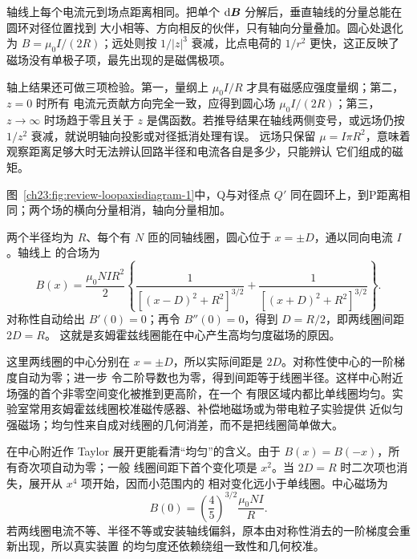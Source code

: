 {轴线上每个电流元到场点距离相同。把单个 $\mathop{}\!\mathrm d\bm{B}$ 分解后，垂直轴线的分量总能在圆环对径位置找到
大小相等、方向相反的伙伴，只有轴向分量叠加。圆心处退化为 $B=\mu_0I/(2R)$；远处则按 $1/|z|^3$
衰减，比点电荷的 $1/r^2$ 更快，这正反映了磁场没有单极子项，最先出现的是磁偶极项。

轴上结果还可做三项检验。第一，量纲上 $\mu_0I/R$ 才具有磁感应强度量纲；第二，$z=0$ 时所有
电流元贡献方向完全一致，应得到圆心场 $\mu_0I/(2R)$；第三，$z\to\infty$ 时场趋于零且关于 $z$
是偶函数。若推导结果在轴线两侧变号，或远场仍按 $1/z^2$ 衰减，就说明轴向投影或对径抵消处理有误。
远场只保留 $\mu=I\pi R^2$，意味着观察距离足够大时无法辨认回路半径和电流各自是多少，只能辨认
它们组成的磁矩。

图~\ref{ch23:fig:review-loopaxisdiagram-1}中，Q与对径点 $Q\prime$ 同在圆环上，到P距离相同；两个场的横向分量相消，轴向分量相加。
\par\noindent\begin{minipage}{\linewidth}
\loopAxisDiagram
{}
\end{minipage}\par\medskip

两个半径均为 $R$、每个有 $N$ 匝的同轴线圈，圆心位于 $x=\pm D$，通以同向电流 $I$。轴线上
的合场为
\begin{equation}
  B(x)=\frac{\mu_0NIR^2}{2}
  \left\{
  \frac{1}{[(x-D)^2+R^2]^{3/2}}
  +\frac{1}{[(x+D)^2+R^2]^{3/2}}
  \right\}.
\end{equation}
对称性自动给出 $B'(0)=0$；再令 $B''(0)=0$，得到 $D=R/2$，即两线圈间距 $2D=R$。
这就是亥姆霍兹线圈能在中心产生高均匀度磁场的原因。

这里两线圈的中心分别在 $x=\pm D$，所以实际间距是 $2D$。对称性使中心的一阶梯度自动为零；进一步
令二阶导数也为零，得到间距等于线圈半径。这样中心附近场强的首个非零空间变化被推到更高阶，在一个
有限区域内都比单线圈均匀。实验室常用亥姆霍兹线圈校准磁传感器、补偿地磁场或为带电粒子实验提供
近似匀强磁场；均匀性来自成对线圈的几何消差，而不是把线圈简单做大。

在中心附近作 Taylor 展开更能看清“均匀”的含义。由于 $B(x)=B(-x)$，所有奇次项自动为零；一般
线圈间距下首个变化项是 $x^2$。当 $2D=R$ 时二次项也消失，展开从 $x^4$ 项开始，因而小范围内的
相对变化远小于单线圈。中心磁场为
\begin{equation}
  B(0)=\left(\frac45\right)^{3/2}\frac{\mu_0NI}{R}.
\end{equation}
若两线圈电流不等、半径不等或安装轴线偏斜，原本由对称性消去的一阶梯度会重新出现，所以真实装置
的均匀度还依赖绕组一致性和几何校准。

}
